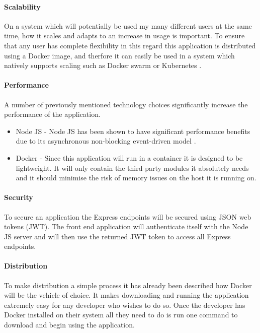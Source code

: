 \paragraph{Scalability}
On a system which will potentially be used my many different users at the same time, how it scales and adapts to an increase in usage is important. To ensure that any user has complete flexibility in this regard this application is distributed using a \gls{Docker image}, and therfore it can easily be used in a system which natively supports scaling such as Docker swarm or Kubernetes \citep{DockerSwarm2017,Kubernetes2017}.

\paragraph{Performance}
A number of previously mentioned technology choices significantly increase the performance of the application. 

\begin{itemize}
	\item Node JS - Node JS has been shown to have significant performance benefits due to its asynchronous non-blocking event-driven model \citep{NodePerformance2010}.
	\item Docker - Since this application will run in a container it is designed to be lightweight. It will only contain the third party modules it absolutely needs and it should minimise the risk of memory issues on the host it is running on.
\end{itemize}

\paragraph{Security}
To secure an application the Express endpoints will be secured using JSON web tokens (\gls{JWT}). The front end application will authenticate itself with the Node JS server and will then use the returned JWT token to access all Express endpoints. 

\paragraph{Distribution}
To make distribution a simple process it has already been described how \gls{Docker} will be the vehicle of choice. It makes downloading and running the application extremely easy for any developer who wishes to do so. Once the developer has Docker installed on their system all they need to do is run one command to download and begin using the application.
